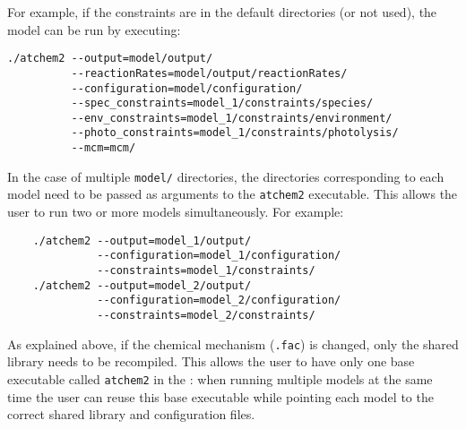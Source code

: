 For example, if the constraints are in the default directories (or not
used), the model can be run by executing:

\begin{verbatim}
./atchem2 --output=model/output/
          --reactionRates=model/output/reactionRates/
          --configuration=model/configuration/
          --spec_constraints=model_1/constraints/species/
          --env_constraints=model_1/constraints/environment/
          --photo_constraints=model_1/constraints/photolysis/
          --mcm=mcm/
\end{verbatim}

In the case of multiple \texttt{model/} directories, the directories
corresponding to each model need to be passed as arguments to the
\texttt{atchem2} executable. This allows the user to run two or more
models simultaneously. For example:

\begin{verbatim}
    ./atchem2 --output=model_1/output/
              --configuration=model_1/configuration/
              --constraints=model_1/constraints/
    ./atchem2 --output=model_2/output/
              --configuration=model_2/configuration/
              --constraints=model_2/constraints/
\end{verbatim}

As explained above, if the chemical mechanism (\texttt{.fac}) is
changed, only the shared library needs to be recompiled. This allows
the user to have only one base executable called \texttt{atchem2} in
the \maindir: when running multiple models at the same
time the user can reuse this base executable while pointing each model
to the correct shared library and configuration files.
